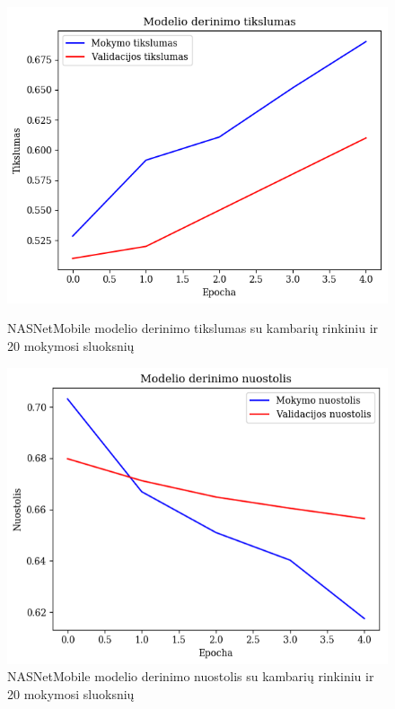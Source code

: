 \documentclass{VUMIFPSbakalaurinis}
\begin{document}
\begin{figure}[!htbp]
    \centering
    \begin{minipage}[b]{0.48\textwidth}
      \includegraphics[width=\textwidth]{img/GrapthsNEW/Small/room/20/Acc_R_S_20.png}
      \caption{NASNetMobile modelio derinimo tikslumas su kambarių rinkiniu ir 20 mokymosi sluoksnių}
    \end{minipage}
    \hspace{2mm}
    \begin{minipage}[b]{0.48\textwidth}
      \includegraphics[width=\textwidth]{img/GrapthsNEW/Small/room/20/Loss_R_S_20.png}
      \caption{NASNetMobile modelio derinimo nuostolis su kambarių rinkiniu ir 20 mokymosi sluoksnių}
    \end{minipage}
\end{figure}
\end{document}
